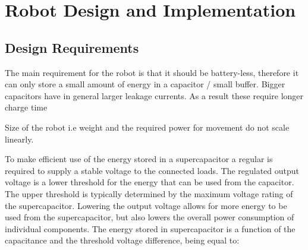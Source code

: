 \chapter{Robot Design and Implementation}


\section{Design Requirements}
\label{sec:design_requirements}



The main requirement for the robot is  that it should be battery-less, therefore it can only store a small amount of energy in a capacitor / small buffer.
Bigger capacitors have in general larger leakage currents.
As a result these require longer charge time

Size of the robot i.e weight and the required power for movement do not scale linearly.

To make efficient use of the energy stored in a supercapacitor a regular is required to supply a stable voltage to the connected loads.
The regulated output voltage is a lower threshold for the energy that can be used from the capacitor.
The upper threshold is typically determined by the maximum voltage rating of the supercapacitor.
Lowering the output voltage allows for more energy to be used from the supercapacitor, but also lowers the overall power consumption of individual components.
The energy stored in supercapacitor is a function of the capacitance and the threshold voltage difference, being equal to:

